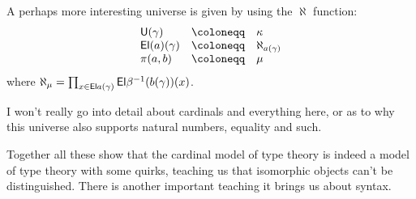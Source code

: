 A perhaps more interesting universe is given by using the \(\aleph\) function:
\[
  \begin{array}{lcl}
    \CU(\gamma) &\coloneqq& \kappa \\
    \CEl(a)(\gamma) &\coloneqq& \aleph_{a(\gamma)} \\
    \pi(a,b) &\coloneqq& \mu
  \end{array}
\]
where
\(\aleph_\mu = \prod_{x \in \mathsf{El}{a(\gamma)}} \mathsf{El}{\beta^{-1}(b(\gamma))(x)}\).

I won't really go into detail about cardinals and everything here, or as to
why this universe also supports natural numbers, equality and such.


Together all these show that the cardinal model of type theory is indeed a model
of type theory with some quirks, teaching us that isomorphic objects can't be
distinguished.
There is another important teaching it brings us about syntax.

